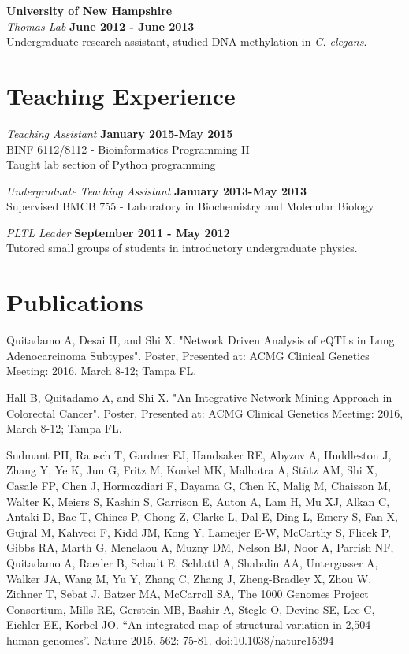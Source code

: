 \documentclass[margin,line]{res}
\begin{document}
\begin{resume}
{\bf University of New Hampshire}\\
{\em Thomas Lab} \hfill {\bf June 2012 - June 2013}\\
Undergraduate research assistant, studied DNA methylation in {\em C. elegans}.\\ 


\section{\sc Teaching Experience}

{\em Teaching Assistant} \hfill {\bf January 2015-May 2015}\\
BINF 6112/8112 - Bioinformatics Programming II\\
Taught lab section of Python programming

{\em Undergraduate Teaching Assistant} \hfill {\bf January 2013-May 2013}\\
Supervised BMCB 755 - Laboratory in Biochemistry and Molecular Biology

{\em PLTL Leader} \hfill {\bf September 2011 - May 2012}\\
Tutored small groups of students in introductory undergraduate physics.

\section{\sc Publications}

Quitadamo A, Desai H, and Shi X. "Network Driven Analysis of eQTLs in Lung Adenocarcinoma Subtypes". Poster, Presented at: ACMG Clinical Genetics Meeting: 2016, March 8-12; Tampa FL.

Hall B, Quitadamo A, and Shi X. "An Integrative Network Mining Approach in Colorectal Cancer". Poster, Presented at: ACMG Clinical Genetics Meeting: 2016, March 8-12; Tampa FL.

Sudmant PH, Rausch T, Gardner EJ, Handsaker RE, Abyzov A, Huddleston J, Zhang Y, Ye K, Jun G, Fritz M, Konkel MK, Malhotra A, Stütz AM, Shi X, Casale FP, Chen J, Hormozdiari F, Dayama G, Chen K, Malig M, Chaisson M, Walter K, Meiers S, Kashin S, Garrison E, Auton A, Lam H, Mu XJ, Alkan C, Antaki D, Bae T, Chines P, Chong Z, Clarke L, Dal E, Ding L, Emery S, Fan X, Gujral M, Kahveci F, Kidd JM, Kong Y, Lameijer E-W, McCarthy S, Flicek P, Gibbs RA, Marth G, Menelaou A, Muzny DM, Nelson BJ, Noor A, Parrish NF, Quitadamo A, Raeder B, Schadt E, Schlattl A, Shabalin AA, Untergasser A, Walker JA, Wang M, Yu Y, Zhang C, Zhang J, Zheng-Bradley X, Zhou W, Zichner T, Sebat J, Batzer MA, McCarroll SA, The 1000 Genomes Project Consortium, Mills RE, Gerstein MB, Bashir A, Stegle O, Devine SE, Lee C, Eichler EE, Korbel JO. “An integrated map of structural variation in 2,504 human genomes”. Nature 2015. 562: 75-81. doi:10.1038/nature15394


\end{resume}
\end{document}
